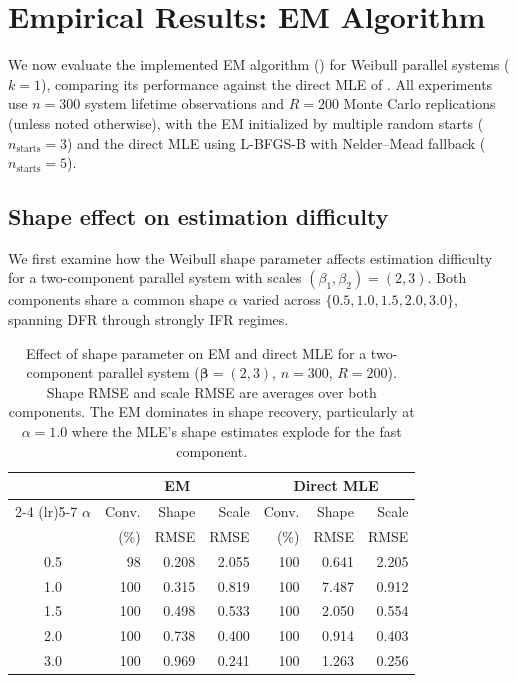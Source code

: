 \documentclass[12pt]{article}
\theoremstyle{definition}
\theoremstyle{remark}
\newcommand{\bbeta}{\boldsymbol{\beta}}
\begin{document}
\section{Empirical Results: EM Algorithm}
\label{sec:em-results}

We now evaluate the implemented EM algorithm
() for Weibull parallel systems ($k = 1$),
comparing its performance against the direct MLE of
.  All experiments use $n = 300$ system
lifetime observations and $R = 200$ Monte Carlo replications
(unless noted otherwise), with the EM initialized by multiple
random starts ($n_{\text{starts}} = 3$) and the direct MLE using
L-BFGS-B with Nelder--Mead fallback ($n_{\text{starts}} = 5$).

\subsection{Shape effect on estimation difficulty}
\label{sec:em-shape-effect}

We first examine how the Weibull shape parameter affects estimation
difficulty for a two-component parallel system with scales
$(\beta_1, \beta_2) = (2, 3)$.  Both components share a common
shape $\alpha$ varied across $\{0.5, 1.0, 1.5, 2.0, 3.0\}$,
spanning DFR through strongly IFR regimes.

\begin{table}[t]
\centering
\caption{%
  Effect of shape parameter on EM and direct MLE for a
  two-component parallel system ($\bbeta = (2, 3)$,
  $n = 300$, $R = 200$).
  Shape RMSE and scale RMSE are averages over both components.
  The EM dominates in shape recovery, particularly at
  $\alpha = 1.0$ where the MLE's shape estimates explode
  for the fast component.
}
\label{tab:shape-effect}
\small
\begin{tabular}{c rr rr rr}
\toprule
& \multicolumn{3}{c}{EM} & \multicolumn{3}{c}{Direct MLE} \\
\cmidrule(lr){2-4} \cmidrule(lr){5-7}
$\alpha$ & Conv. & Shape & Scale
         & Conv. & Shape & Scale \\
         &  (\%) & RMSE & RMSE
         &  (\%) & RMSE & RMSE \\
\midrule
0.5 &  98 & 0.208 & 2.055 & 100 & 0.641 & 2.205 \\
1.0 & 100 & 0.315 & 0.819 & 100 & 7.487 & 0.912 \\
1.5 & 100 & 0.498 & 0.533 & 100 & 2.050 & 0.554 \\
2.0 & 100 & 0.738 & 0.400 & 100 & 0.914 & 0.403 \\
3.0 & 100 & 0.969 & 0.241 & 100 & 1.263 & 0.256 \\
\bottomrule
\end{tabular}
\end{table}
\end{document}
